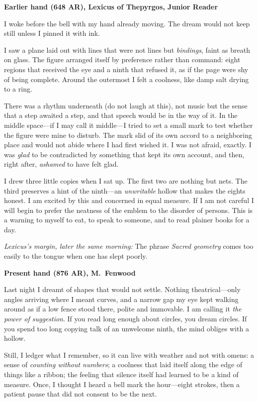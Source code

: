 \documentclass[11pt]{article}
\begin{document}
\medskip
\noindent\textbf{Earlier hand (648 AR), Lexicus of Thepyrgos, Junior Reader}

I woke before the bell with my hand already moving. The dream would not keep still unless I pinned it with ink.

I saw a plane laid out with lines that were not lines but \emph{bindings}, faint as breath on glass. The figure arranged itself by preference rather than command: eight regions that received the eye and a ninth that refused it, as if the page were shy of being complete. Around the outermost I felt a coolness, like damp salt drying to a ring.

There was a rhythm underneath (do not laugh at this), not music but the sense that a step awaited a step, and that speech would be in the way of it. In the middle space—if I may call it middle—I tried to set a small mark to test whether the figure were mine to disturb. The mark slid of its own accord to a neighboring place and would not abide where I had first wished it. I was not afraid, exactly. I was \emph{glad} to be contradicted by something that kept its own account, and then, right after, \emph{ashamed} to have felt glad.

I drew three little copies when I sat up. The first two are nothing but nets. The third preserves a hint of the ninth—an \emph{unwritable} hollow that makes the eights honest. I am excited by this and concerned in equal measure. If I am not careful I will begin to prefer the neatness of the emblem to the disorder of persons. This is a warning to myself to eat, to speak to someone, and to read plainer books for a day.

\medskip
\noindent\textit{Lexicus’s margin, later the same morning:} The phrase \emph{Sacred geometry} comes too easily to the tongue when one has slept poorly.

\medskip
\noindent\textbf{Present hand (876 AR), M.\ Fenwood}

Last night I dreamt of shapes that would not settle. Nothing theatrical—only angles arriving where I meant curves, and a narrow gap my eye kept walking around as if a low fence stood there, polite and immovable. I am calling it \emph{the power of suggestion}. If you read long enough about circles, you dream circles. If you spend too long copying talk of an unwelcome ninth, the mind obliges with a hollow.

Still, I ledger what I remember, so it can live with weather and not with omens: a sense of \emph{counting without numbers}; a coolness that laid itself along the edge of things like a ribbon; the feeling that silence itself had learned to be a kind of measure. Once, I thought I heard a bell mark the hour—eight strokes, then a patient pause that did not consent to be the next.
\end{document}
